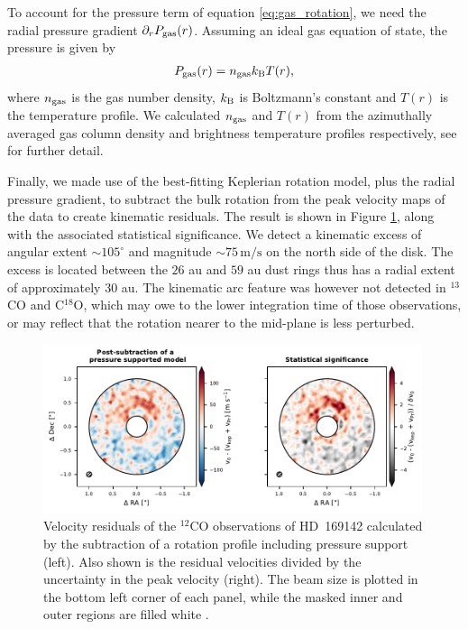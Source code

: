 To account for the pressure term of equation \ref{eq:gas_rotation}, we need the radial pressure gradient $\partial_r P_{\rm gas}(r)$.
Assuming an ideal gas equation of state, the pressure is given by 
\begin{align}
    P_{\rm gas}(r) = n_{\rm gas} k_{\rm B} T(r),
\end{align}
where $n_{\rm gas}$ is the gas number density, $k_{\rm B}$ is Boltzmann's constant and $T(r)$ is the temperature profile.
We calculated $n_{\rm gas}$ and $T(r)$ from the azimuthally averaged gas column density and brightness temperature profiles respectively, see \citet{garg2022} for further detail.

Finally, we made use of the best-fitting Keplerian rotation model, plus the radial pressure gradient, to subtract the bulk rotation from the peak velocity maps of the data to create kinematic residuals.
The result is shown in Figure \ref{fig:garg_arc}, along with the associated statistical significance.
We detect a kinematic excess of angular extent $\sim 105^\circ$ and magnitude $\sim 75 \, \mathrm{m/s}$ on the north side of the disk.
The excess is located between the $26$ au and $59$ au dust rings thus has a radial extent of approximately $30$ au.
The kinematic arc feature was however not detected in $^{13}$CO and C$^{18}$O, which may owe to the lower integration time of those observations, or may reflect that the rotation nearer to the mid-plane is less perturbed.

\begin{figure}
    \centering
    \includegraphics[width = 0.99\textwidth]{figures/garg_arc.pdf}
    \caption{Velocity residuals of the $^{12}$CO observations of HD~169142 calculated by the subtraction of a rotation profile including pressure support (left). Also shown is the residual velocities divided by the uncertainty in the peak velocity (right). The beam size is plotted in the bottom left corner of each panel, while the masked inner and outer regions are filled white \citep{garg2022}.}
    \label{fig:garg_arc}
\end{figure}

